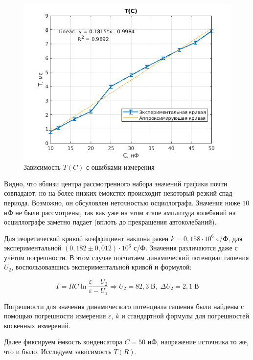 \begin{figure}[h]
    \centering
    \includegraphics[width = 10 cm]{images/TC2.png}
    \caption{Зависимость $T(C)$ с ошибками измерения}
    \label{TC2}
\end{figure}

Видно, что вблизи центра рассмотренного набора значений графики почти совпадают, но на более низких ёмокстях происходит некоторый резкий спад периода. Возможно, он обсуловлен неточностью осциллографа. Значения ниже $10$ нФ не были рассмотрены, так как уже на этом этапе амплитуда колебаний на осциллографе заметно падает (вплоть до прекращения автоколебаний).

Для теоретической кривой коэффициент наклона равен $k = 0,158 \cdot 10^6$ с/Ф, для экспериментальной $(0,182 \pm 0,012) \cdot 10^6$ с/Ф. Значения различаются даже с учётом погрешности. В этом случае посчитаем динамический потенциал гашения $U_2$, воспользовавшись экспериментальной кривой и формулой:

\begin{equation}
    T = RC \ln{\frac{\varepsilon - U_2}{\varepsilon - U_1}} \Rightarrow U_2 = 82,3 \; \text{В}, \; \Delta U_2 = 2,1 \; \text{В}
\end{equation}

Погрешности для значения динамического потенциала гашения были найдены с помощью погрешности измерения $\varepsilon$, $k$ и стандартной формулы для погрешностей косвенных измерений.

Далее фиксируем ёмкость конденсатора $C = 50$ нФ, напряжение источника то же, что и было. Исследуем зависимость $T(R)$.

